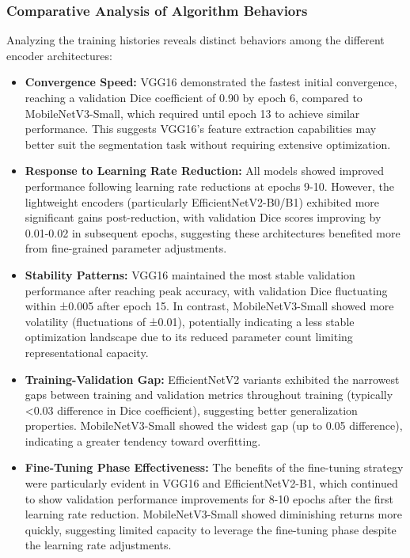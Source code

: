 \subsubsection{Comparative Analysis of Algorithm Behaviors}
Analyzing the training histories reveals distinct behaviors among the different encoder architectures:

\begin{itemize}
  \item \textbf{Convergence Speed:} VGG16 demonstrated the fastest initial convergence, reaching a validation Dice coefficient of 0.90 by epoch 6, compared to MobileNetV3-Small, which required until epoch 13 to achieve similar performance. This suggests VGG16's feature extraction capabilities may better suit the segmentation task without requiring extensive optimization.

  \item \textbf{Response to Learning Rate Reduction:} All models showed improved performance following learning rate reductions at epochs 9-10. However, the lightweight encoders (particularly EfficientNetV2-B0/B1) exhibited more significant gains post-reduction, with validation Dice scores improving by 0.01-0.02 in subsequent epochs, suggesting these architectures benefited more from fine-grained parameter adjustments.

  \item \textbf{Stability Patterns:} VGG16 maintained the most stable validation performance after reaching peak accuracy, with validation Dice fluctuating within ±0.005 after epoch 15. In contrast, MobileNetV3-Small showed more volatility (fluctuations of ±0.01), potentially indicating a less stable optimization landscape due to its reduced parameter count limiting representational capacity.

  \item \textbf{Training-Validation Gap:} EfficientNetV2 variants exhibited the narrowest gaps between training and validation metrics throughout training (typically <0.03 difference in Dice coefficient), suggesting better generalization properties. MobileNetV3-Small showed the widest gap (up to 0.05 difference), indicating a greater tendency toward overfitting.

  \item \textbf{Fine-Tuning Phase Effectiveness:} The benefits of the fine-tuning strategy were particularly evident in VGG16 and EfficientNetV2-B1, which continued to show validation performance improvements for 8-10 epochs after the first learning rate reduction. MobileNetV3-Small showed diminishing returns more quickly, suggesting limited capacity to leverage the fine-tuning phase despite the learning rate adjustments.
\end{itemize}

